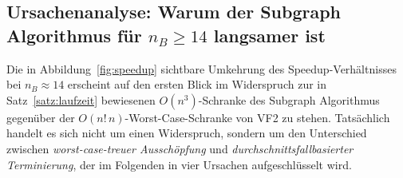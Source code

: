 \documentclass[a4paper,12pt]{article}
\theoremstyle{definition}
\begin{document}
\subsection{Ursachenanalyse: Warum der Subgraph Algorithmus für $n_B\ge 14$ langsamer ist}
\label{sec:ursachen}

Die in Abbildung~\ref{fig:speedup} sichtbare Umkehrung des Speedup-Verhältnisses bei $n_B\approx 14$ erscheint auf den ersten Blick im Widerspruch zur in Satz~\ref{satz:laufzeit} bewiesenen $O(n^3)$-Schranke des Subgraph Algorithmus gegenüber der $O(n!\,n)$-Worst-Case-Schranke von VF2 \cite{cordella2004} zu stehen. Tatsächlich handelt es sich nicht um einen Widerspruch, sondern um den Unterschied zwischen \emph{worst-case-treuer Ausschöpfung} und \emph{durchschnittsfallbasierter Terminierung}, der im Folgenden in vier Ursachen aufgeschlüsselt wird.
\end{document}
